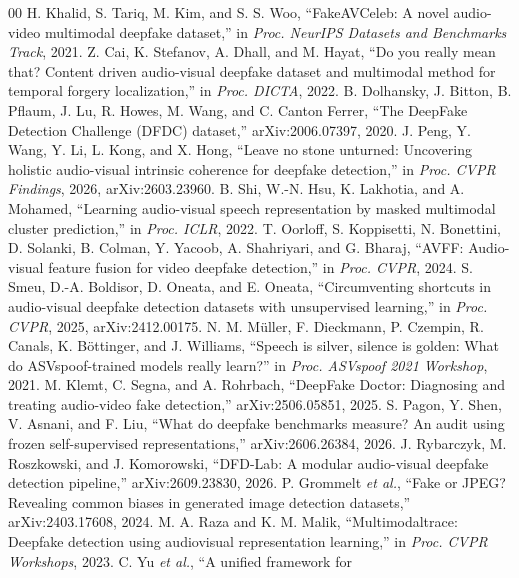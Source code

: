 \documentclass[conference]{IEEEtran}
\begin{document}
\begin{thebibliography}{00}
 H. Khalid, S. Tariq, M. Kim, and S. S. Woo,
``FakeAVCeleb: A novel audio-video multimodal deepfake dataset,'' in
\textit{Proc. NeurIPS Datasets and Benchmarks Track}, 2021.
 Z. Cai, K. Stefanov, A. Dhall, and M. Hayat, ``Do you really
mean that? Content driven audio-visual deepfake dataset and multimodal method
for temporal forgery localization,'' in \textit{Proc. DICTA}, 2022.
 B. Dolhansky, J. Bitton, B. Pflaum, J. Lu, R. Howes, M. Wang,
and C. Canton Ferrer, ``The DeepFake Detection Challenge (DFDC) dataset,''
arXiv:2006.07397, 2020.
 J. Peng, Y. Wang, Y. Li, L. Kong, and X. Hong, ``Leave no
stone unturned: Uncovering holistic audio-visual intrinsic coherence for
deepfake detection,'' in \textit{Proc. CVPR Findings}, 2026, arXiv:2603.23960.
 B. Shi, W.-N. Hsu, K. Lakhotia, and A. Mohamed, ``Learning
audio-visual speech representation by masked multimodal cluster prediction,''
in \textit{Proc. ICLR}, 2022.
 T. Oorloff, S. Koppisetti, N. Bonettini, D. Solanki,
B. Colman, Y. Yacoob, A. Shahriyari, and G. Bharaj, ``AVFF: Audio-visual
feature fusion for video deepfake detection,'' in \textit{Proc. CVPR}, 2024.
 S. Smeu, D.-A. Boldisor, D. Oneata, and E. Oneata,
``Circumventing shortcuts in audio-visual deepfake detection datasets with
unsupervised learning,'' in \textit{Proc. CVPR}, 2025, arXiv:2412.00175.
 N. M. M\"uller, F. Dieckmann, P. Czempin, R. Canals,
K. B\"ottinger, and J. Williams, ``Speech is silver, silence is golden: What do
ASVspoof-trained models really learn?'' in \textit{Proc. ASVspoof 2021
Workshop}, 2021.
 M. Klemt, C. Segna, and A. Rohrbach, ``DeepFake
Doctor: Diagnosing and treating audio-video fake detection,''
arXiv:2506.05851, 2025.
 S. Pagon, Y. Shen, V. Asnani, and F. Liu, ``What do
deepfake benchmarks measure? An audit using frozen self-supervised
representations,'' arXiv:2606.26384, 2026.
 J. Rybarczyk, M. Roszkowski, and J. Komorowski,
``DFD-Lab: A modular audio-visual deepfake detection pipeline,''
arXiv:2609.23830, 2026.
 P. Grommelt \textit{et al.}, ``Fake or JPEG? Revealing
common biases in generated image detection datasets,'' arXiv:2403.17608,
2024.
 M. A. Raza and K. M. Malik, ``Multimodaltrace:
Deepfake detection using audiovisual representation learning,'' in
\textit{Proc. CVPR Workshops}, 2023.
 C. Yu \textit{et al.}, ``A unified framework for

\end{thebibliography}
\end{document}
